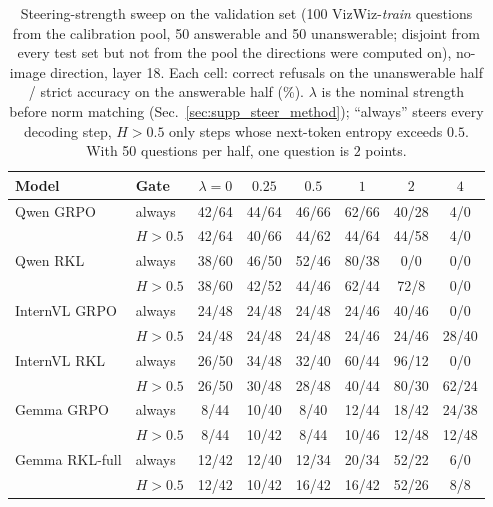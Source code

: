 \begin{table}[t]
\centering\small
\setlength{\tabcolsep}{3.5pt}
\begin{tabular}{llcccccc}
\toprule
Model & Gate & $\lambda{=}0$ & $0.25$ & $0.5$ & $1$ & $2$ & $4$ \\
\midrule
Qwen GRPO & always & 42/64 & 44/64 & 46/66 & 62/66 & 40/28 & 4/0 \\
 & $H{>}0.5$ & 42/64 & 40/66 & 44/62 & 44/64 & 44/58 & 4/0 \\
\midrule
Qwen RKL & always & 38/60 & 46/50 & 52/46 & 80/38 & 0/0 & 0/0 \\
 & $H{>}0.5$ & 38/60 & 42/52 & 44/46 & 62/44 & 72/8 & 0/0 \\
\midrule
InternVL GRPO & always & 24/48 & 24/48 & 24/48 & 24/46 & 40/46 & 0/0 \\
 & $H{>}0.5$ & 24/48 & 24/48 & 24/48 & 24/46 & 24/46 & 28/40 \\
\midrule
InternVL RKL & always & 26/50 & 34/48 & 32/40 & 60/44 & 96/12 & 0/0 \\
 & $H{>}0.5$ & 26/50 & 30/48 & 28/48 & 40/44 & 80/30 & 62/24 \\
\midrule
Gemma GRPO & always & 8/44 & 10/40 & 8/40 & 12/44 & 18/42 & 24/38 \\
 & $H{>}0.5$ & 8/44 & 10/42 & 8/44 & 10/46 & 12/48 & 12/48 \\
\midrule
Gemma RKL-full & always & 12/42 & 12/40 & 12/34 & 20/34 & 52/22 & 6/0 \\
 & $H{>}0.5$ & 12/42 & 10/42 & 16/42 & 16/42 & 52/26 & 8/8 \\
\bottomrule
\end{tabular}
\caption{Steering-strength sweep on the validation set (100 VizWiz-\emph{train} questions from the calibration pool, 50 answerable and 50 unanswerable; disjoint from every test set but not from the pool the directions were computed on), no-image direction, layer 18. Each cell: correct refusals on the unanswerable half / strict accuracy on the answerable half (\%). $\lambda$ is the nominal strength before norm matching (Sec.~\ref{sec:supp_steer_method}); ``always'' steers every decoding step, $H{>}0.5$ only steps whose next-token entropy exceeds $0.5$. With 50 questions per half, one question is $2$ points.}
\label{tab:supp_steer_val_noimg}
\end{table}

